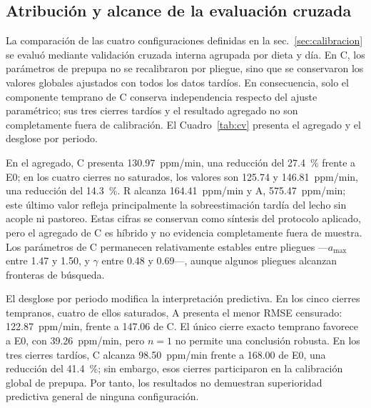 \subsection{Atribución y alcance de la evaluación cruzada}
\label{sec:atribucion}

La comparación de las cuatro configuraciones definidas en la sec.~\ref{sec:calibracion} se evaluó mediante validación cruzada interna agrupada por dieta y día. En C, los parámetros de prepupa no se recalibraron por pliegue, sino que se conservaron los valores globales ajustados con todos los datos tardíos. En consecuencia, solo el componente temprano de C conserva independencia respecto del ajuste paramétrico; sus tres cierres tardíos y el resultado agregado no son completamente fuera de calibración. El Cuadro~\ref{tab:cv} presenta el agregado y el desglose por periodo.

En el agregado, C presenta 130.97~ppm/min, una reducción del 27.4~\% frente a E0; en los cuatro cierres no saturados, los valores son 125.74 y 146.81~ppm/min, una reducción del 14.3~\%. R alcanza 164.41~ppm/min y A, 575.47~ppm/min; este último valor refleja principalmente la sobreestimación tardía del lecho sin acople ni pastoreo. Estas cifras se conservan como síntesis del protocolo aplicado, pero el agregado de C es híbrido y no evidencia completamente fuera de muestra. Los parámetros de C permanecen relativamente estables entre pliegues ---$a_{\max}$ entre 1.47 y 1.50, y $\gamma$ entre 0.48 y 0.69---, aunque algunos pliegues alcanzan fronteras de búsqueda.

El desglose por periodo modifica la interpretación predictiva. En los cinco cierres tempranos, cuatro de ellos saturados, A presenta el menor RMSE censurado: 122.87~ppm/min, frente a 147.06 de C. El único cierre exacto temprano favorece a E0, con 39.26~ppm/min, pero $n=1$ no permite una conclusión robusta. En los tres cierres tardíos, C alcanza 98.50~ppm/min frente a 168.00 de E0, una reducción del 41.4~\%; sin embargo, esos cierres participaron en la calibración global de prepupa. Por tanto, los resultados no demuestran superioridad predictiva general de ninguna configuración.

